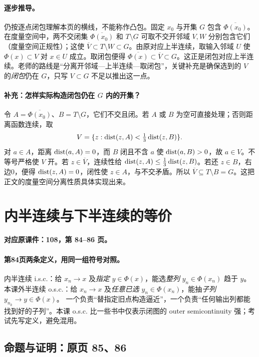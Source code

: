 \paragraph{逐步推导。}仍按逐点闭包理解本页的横线，不能称作凸包。固定 $x_0$ 与开集 $G$ 包含 $\overline{\Phi(x_0)}$。在度量空间中，两不交闭集 $\overline{\Phi(x_0)}$ 和 $T\setminus G$ 可取不交开邻域 $V,W$ 分别包含它们（度量空间正规性）；这使 $\overline V\subset T\setminus W\subset G$。由原对应上半连续，取输入邻域 $U$ 使 $\Phi(x)\subset V$ 对 $x\in U$ 成立。取闭包便得 $\overline{\Phi(x)}\subset\overline V\subset G$。这正是闭包对应上半连续。老师的路线是“分离开邻域—上半连续—取闭包”，关键补充是确保选到的 $V$ 的\emph{闭包}仍在 $G$，只写 $V\subset G$ 不足以推出这一点。


\paragraph{补充：怎样实际构造闭包仍在 $G$ 内的开集？}
令 $A=\overline{\Phi(x_0)}$、$B=T\setminus G$，它们不交且闭。若 $A$ 或 $B$ 为空可直接处理；否则距离函数连续，取
\[V=\{z:\operatorname{dist}(z,A)<\tfrac13\operatorname{dist}(z,B)\}.
\]
对 $a\in A$，距离 $\operatorname{dist}(a,A)=0$，而 $B$ 闭且不含 $a$ 使 $\operatorname{dist}(a,B)>0$，故 $a\in V$。不等号严格使 $V$ 开。若 $z\in\overline V$，连续性给 $\operatorname{dist}(z,A)\le\tfrac13\operatorname{dist}(z,B)$。若还 $z\in B$，右边0，便得 $\operatorname{dist}(z,A)=0$，闭性使 $z\in A$，与不交矛盾。所以 $\overline V\subseteq T\setminus B=G$。这把正文的度量空间分离性质具体实现出来。


\clearpage\section{内半连续与下半连续的等价}\label{g:108:84}

\textbf{对应原课件：108，第 84--86 页。}


\paragraph{第84页两条定义，用同一组符号对照。}
内半连续 i.s.c.：给 $x_n\to x$ 及\emph{指定} $y\in\Phi(x)$，能选\emph{整列} $y_n\in\Phi(x_n)$ 趋于 $y$。
本课外半连续 o.s.c.：给 $x_n\to x$ 及\emph{任意已选} $y_n\in\Phi(x_n)$，能抽\emph{子列} $y_{n_k}\to y\in\Phi(x)$。
一个负责“替指定旧点构造逼近”，一个负责“任何输出列都能找到好的子列”。本课 o.s.c. 比一些书中仅表示闭图的 outer semicontinuity 强；考试先写定义，避免混用。


\subsection{命题与证明：原页 85、86}

